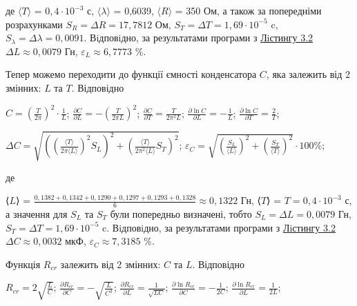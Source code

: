 \documentclass[12pt,a4paper]{article}
\begin{document}
    де $\text{⟨}T\text{⟩}$ = $0,4 \cdot 10^{-3}$ с, $\text{⟨}\lambda\text{⟩}$ = 0,6039, $\text{⟨}R\text{⟩}$ = 350 Ом, а також за попередніми розрахунками $S_R = \Delta R = 17,7812$ Ом, $S_T = \Delta T = 1,69 \cdot 10^{-5}$ c,
    $S_{\lambda} = \Delta \lambda = 0,0091$. Вiдповiдно, за результатами програми з \hyperlink{listing2}{Лiстингу 3.2} $\Delta L \approx 0,0079$ Гн, $\varepsilon_L \approx 6,7773$ \%.

    Тепер можемо переходити до функції ємності конденсатора $C$, яка залежить від 2 змінних: $L$ та $T$. Відповідно

    \begin{center}
        $\displaystyle C = \left( \frac{T}{2\pi} \right)^2 \cdot \frac{1}{L}$; $\displaystyle \frac{\partial C}{\partial L} = -\left( \frac{T}{2\pi L} \right)^2$; $\displaystyle \frac{\partial C}{\partial T} = \frac{T}{2\pi^2 L}$;
        $\displaystyle \frac{\partial \ln C}{\partial L} = -\frac{1}{L}$; $\displaystyle \frac{\partial \ln C}{\partial T} = \frac{2}{T}$;
    \end{center}

    \begin{center}
        $\displaystyle \Delta C = \sqrt{\left( \left( \frac{\text{⟨}T\text{⟩}}{2\pi\text{⟨}L\text{⟩}} \right)^2 S_{L} \right)^2 + \left( \frac{\text{⟨}T\text{⟩}}{2\pi^2\text{⟨}L\text{⟩}} S_T \right)^2}$;
        $\displaystyle \varepsilon_C = \sqrt{\left( \frac{S_{L}}{\text{⟨}L\text{⟩}} \right)^2 + \left( \frac{S_{T}}{\text{⟨}T\text{⟩}} \right)^2} \cdot 100 \%$;
    \end{center}

    де

    ⟨$L$⟩ = $\displaystyle \frac{0,1382 + 0,1342 + 0,1290 + 0,1297 + 0,1293 + 0,1328}{6} \approx 0,1322$ Гн, ⟨$T$⟩ = $T = 0,4 \cdot 10^{-3}$ с, а значення для $S_L$ та $S_T$ були попередньо визначені, тобто $S_{L} = \Delta L = 0,0079$ Гн,
    $S_T = \Delta T = 1,69 \cdot 10^{-5}$ c. Вiдповiдно, за результатами програми з \hyperlink{listing2}{Лiстингу 3.2} $\Delta C \approx 0,0032$ мкФ, $\varepsilon_C \approx 7,3185$ \%.

    Функція $R_{cr}$ залежить від 2 змінних: $C$ та $L$. Відповідно

    \begin{center}
        $\displaystyle R_{cr} = 2 \sqrt{\frac{L}{C}}$; $\displaystyle \frac{\partial R_{cr}}{\partial C} = -\sqrt{\frac{L}{C^3}}$; $\displaystyle \frac{\partial R_{cr}}{\partial L} = \frac{1}{\sqrt{LC}}$;
        $\displaystyle \frac{\partial \ln R_{cr}}{\partial C} = -\frac{1}{2C}$; $\displaystyle \frac{\partial \ln R_{cr}}{\partial L} = \frac{1}{2L}$;
    \end{center}
\end{document}
